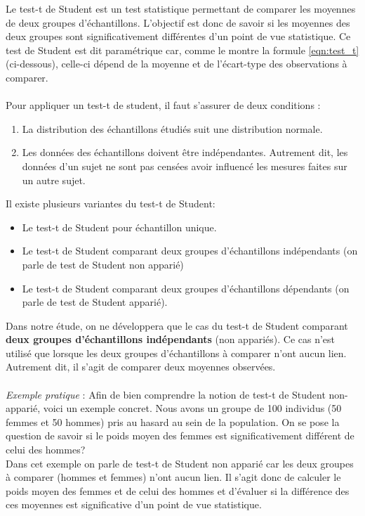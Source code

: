 \documentclass[10pt, oneside, a4paper]{article}
\begin{document}
Le test-t de Student est un test statistique permettant de comparer les moyennes de deux groupes d’échantillons. L'objectif est donc de savoir si les moyennes des deux groupes sont significativement différentes d'un point de vue statistique. Ce test de Student est dit paramétrique car, comme le montre la formule \ref{eqn:test_t} (ci-dessous), celle-ci dépend de la moyenne et de l’écart-type des observations à comparer. \\ \\
Pour appliquer un test-t de student, il faut s'assurer de deux conditions : 
\begin{enumerate}
\item La distribution des échantillons étudiés suit une distribution normale.
\item  Les données des échantillons doivent être indépendantes. Autrement dit, les données d'un sujet ne sont pas censées avoir influencé les mesures faites sur un autre sujet. \\
\end{enumerate}
Il existe plusieurs variantes du test-t de Student:
\begin{itemize}
\item Le test-t de Student pour échantillon unique.
\item Le test-t de Student comparant deux groupes d’échantillons indépendants (on parle de test de Student non apparié)
\item Le test-t de Student comparant deux groupes d’échantillons dépendants (on parle de test de Student apparié). \\
\end{itemize}
Dans notre étude, on ne développera que le cas du test-t de Student comparant \textbf{deux groupes d'échantillons indépendants} (non appariés). Ce cas n'est utilisé que lorsque les deux groupes d'échantillons à comparer n'ont aucun lien. Autrement dit, il s'agit de comparer deux moyennes observées. \\ \\
\textit{Exemple pratique} : Afin de bien comprendre la notion de test-t de Student non-apparié, voici un exemple concret.
Nous avons un groupe de 100 individus (50 femmes et 50 hommes) pris au hasard au sein de la population. On se pose la question de savoir si le poids moyen des femmes est significativement différent de celui des hommes? \\
Dans cet exemple on parle de test-t de Student non apparié car les deux groupes à comparer (hommes et femmes) n’ont aucun lien. Il s’agit donc de calculer le poids moyen des femmes et de celui des hommes et d’évaluer si la différence des ces moyennes est significative d'un point de vue statistique.
\end{document}
